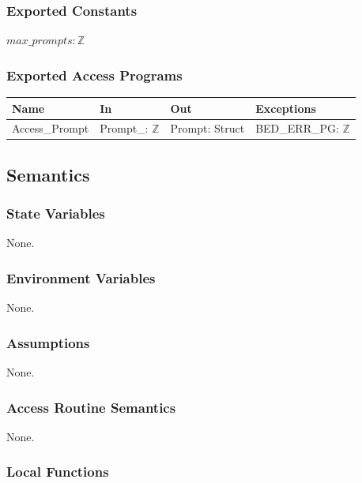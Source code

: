 \documentclass[12pt, titlepage]{article}
\begin{document}
\subsubsection{Exported Constants}

$max\_prompts: \mathbb{Z}$

\subsubsection{Exported Access Programs}

\begin{center}
\begin{tabular}{p{3cm} p{3cm} p{3cm} p{4cm}}
\hline
\textbf{Name} & \textbf{In} & \textbf{Out} & \textbf{Exceptions} \\
\hline
Access\_Prompt & Prompt\_: $\mathbb{Z}$ & Prompt: Struct & BED\_ERR\_PG: $\mathbb{Z}$ \\
\hline
\end{tabular}
\end{center}

\subsection{Semantics}

\subsubsection{State Variables}

None.

\subsubsection{Environment Variables}

None.

\subsubsection{Assumptions}

None.

\subsubsection{Access Routine Semantics}

None.

\subsubsection{Local Functions}
\end{document}
